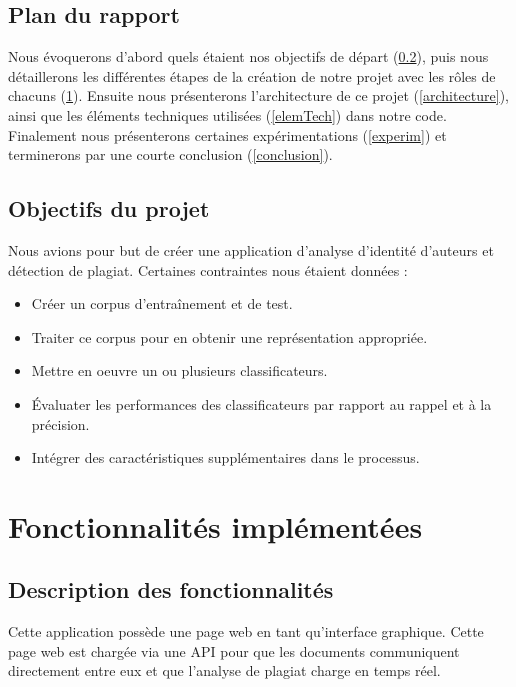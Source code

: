 \documentclass[french,12pt]{article}
\begin{document}
\subsection{Plan du rapport}

Nous évoquerons d'abord quels étaient nos objectifs de départ (\ref{objectifs}), puis nous détaillerons les différentes étapes de la création de notre projet avec les rôles de chacuns (\ref{organisation}). Ensuite nous présenterons l'architecture de ce projet (\ref{architecture}), ainsi que les éléments techniques utilisées (\ref{elemTech}) dans notre code. Finalement nous présenterons certaines expérimentations (\ref{experim}) et terminerons par une courte conclusion (\ref{conclusion}).

\subsection{Objectifs du projet} \label{objectifs}

Nous avions pour but de créer une application d'analyse d’identité d’auteurs et détection de plagiat. Certaines contraintes nous étaient données :
\begin{itemize}
	\item Créer un corpus d'entraînement et de test.
	\item Traiter ce corpus pour en obtenir une représentation appropriée.
	\item Mettre en oeuvre un ou plusieurs classificateurs.
	\item Évaluater les performances des classificateurs par rapport au
	rappel et à la précision.
	\item Intégrer des caractéristiques supplémentaires dans le processus.
\end{itemize}

\section{Fonctionnalités implémentées} \label{organisation}

\subsection{Description des fonctionnalités}

Cette application possède une page web en tant qu'interface graphique. Cette page web est chargée via une API pour que les documents communiquent directement entre eux et que l'analyse de plagiat charge en temps réel.\\
\end{document}
